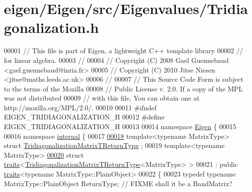 \hypertarget{eigen_2_eigen_2src_2_eigenvalues_2_tridiagonalization_8h_source}{}\section{eigen/\+Eigen/src/\+Eigenvalues/\+Tridiagonalization.h}
\label{eigen_2_eigen_2src_2_eigenvalues_2_tridiagonalization_8h_source}

\begin{DoxyCode}
00001 \textcolor{comment}{// This file is part of Eigen, a lightweight C++ template library}
00002 \textcolor{comment}{// for linear algebra.}
00003 \textcolor{comment}{//}
00004 \textcolor{comment}{// Copyright (C) 2008 Gael Guennebaud <gael.guennebaud@inria.fr>}
00005 \textcolor{comment}{// Copyright (C) 2010 Jitse Niesen <jitse@maths.leeds.ac.uk>}
00006 \textcolor{comment}{//}
00007 \textcolor{comment}{// This Source Code Form is subject to the terms of the Mozilla}
00008 \textcolor{comment}{// Public License v. 2.0. If a copy of the MPL was not distributed}
00009 \textcolor{comment}{// with this file, You can obtain one at http://mozilla.org/MPL/2.0/.}
00010 
00011 \textcolor{preprocessor}{#ifndef EIGEN\_TRIDIAGONALIZATION\_H}
00012 \textcolor{preprocessor}{#define EIGEN\_TRIDIAGONALIZATION\_H}
00013 
00014 \textcolor{keyword}{namespace }\hyperlink{namespace_eigen}{Eigen} \{ 
00015 
00016 \textcolor{keyword}{namespace }\hyperlink{namespaceinternal}{internal} \{
00017   
\hyperlink{struct_eigen_1_1internal_1_1_tridiagonalization_matrix_t_return_type}{00018} \textcolor{keyword}{template}<\textcolor{keyword}{typename} MatrixType> \textcolor{keyword}{struct }\hyperlink{struct_eigen_1_1internal_1_1_tridiagonalization_matrix_t_return_type}{TridiagonalizationMatrixTReturnType}
      ;
00019 \textcolor{keyword}{template}<\textcolor{keyword}{typename} MatrixType>
\hyperlink{struct_eigen_1_1internal_1_1traits_3_01_tridiagonalization_matrix_t_return_type_3_01_matrix_type_01_4_01_4}{00020} \textcolor{keyword}{struct }\hyperlink{struct_eigen_1_1internal_1_1traits}{traits}<\hyperlink{struct_eigen_1_1internal_1_1_tridiagonalization_matrix_t_return_type}{TridiagonalizationMatrixTReturnType}<MatrixType> >
00021   : \textcolor{keyword}{public} \hyperlink{struct_eigen_1_1internal_1_1traits}{traits}<typename MatrixType::PlainObject>
00022 \{
00023   \textcolor{keyword}{typedef} \textcolor{keyword}{typename} MatrixType::PlainObject ReturnType; \textcolor{comment}{// FIXME shall it be a BandMatrix?}

\end{DoxyCode}

